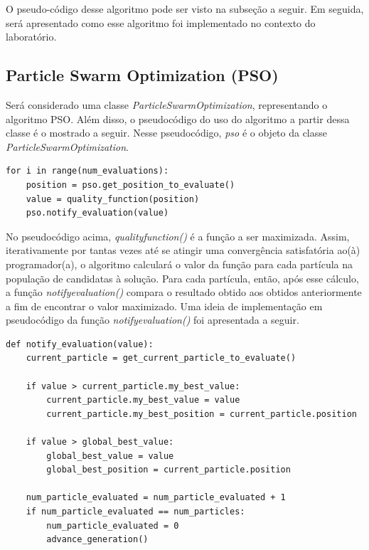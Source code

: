 \documentclass[conference]{IEEEtran}
\begin{document}
O pseudo-código desse algoritmo pode ser visto na subseção a seguir. Em seguida, será apresentado como esse algoritmo foi implementado no contexto do laboratório.

\subsection{Particle Swarm Optimization (PSO)}
Será considerado uma classe \textit{ParticleSwarmOptimization}, representando o algoritmo PSO. Além disso, o pseudocódigo do uso do algoritmo a partir dessa classe é o mostrado a seguir. Nesse pseudocódigo, \textit{pso} é o objeto da classe \textit{ParticleSwarmOptimization}.

\begin{lstlisting}
for i in range(num_evaluations):
	position = pso.get_position_to_evaluate()
	value = quality_function(position)
	pso.notify_evaluation(value)
\end{lstlisting}

No pseudocódigo acima, \textit{quality\underline{\space}function()} é a função a ser maximizada. Assim, iterativamente por tantas vezes até se atingir uma convergência satisfatória ao(à) programador(a), o algoritmo calculará o valor da função para cada partícula na população de candidatas à solução. Para cada partícula, então, após esse cálculo, a função \textit{notify\underline{\space}evaluation()} compara o resultado obtido aos obtidos anteriormente a fim de encontrar o valor maximizado. Uma ideia de implementação em pseudocódigo da função \textit{notify\underline{\space}evaluation()} foi apresentada a seguir.

\begin{lstlisting}
def notify_evaluation(value):
	current_particle = get_current_particle_to_evaluate()

	if value > current_particle.my_best_value:
		current_particle.my_best_value = value
		current_particle.my_best_position = current_particle.position

	if value > global_best_value:
		global_best_value = value
		global_best_position = current_particle.position

	num_particle_evaluated = num_particle_evaluated + 1
	if num_particle_evaluated == num_particles:
		num_particle_evaluated = 0
		advance_generation()
\end{lstlisting}
\end{document}
